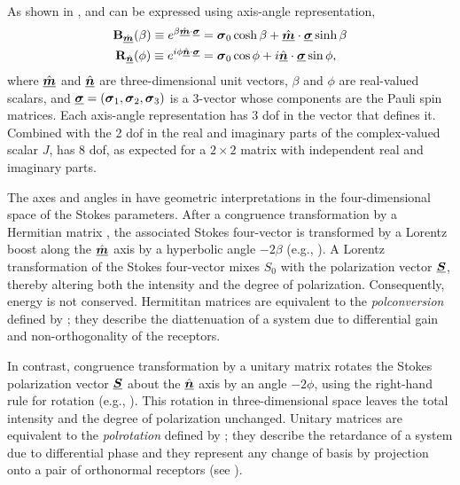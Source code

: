 As shown in ,  and
 can be expressed using axis-angle representation,
%
\begin{align}
\label{eqn:Boost}
{\bf B}_{\hat{\underline{\mbox{\scriptsize\boldmath $m$}}}}(\beta) \equiv e^{\beta \hat{\underline{\mbox{\scriptsize\boldmath $m$}}} \cdot \underline{\mbox{\scriptsize\boldmath $\sigma$}}} &= \mbox{\boldmath $\sigma$}_{0}\cosh\beta + \hat{\underline{\mbox{\boldmath $m$}}} \cdot \underline{\mbox{\boldmath $\sigma$}} \sinh\beta \\
\label{eqn:Rotation}
{\bf R}_{\hat{\underline{\mbox{\scriptsize\boldmath $n$}}}}(\phi) \equiv e^{ i \phi \hat{\underline{\mbox{\scriptsize\boldmath $n$}}} \cdot \underline{\mbox{\scriptsize\boldmath $\sigma$}} } &= \mbox{\boldmath $\sigma$}_{0}\cos\phi + i \hat{\underline{\mbox{\boldmath $n$}}} \cdot \underline{\mbox{\boldmath $\sigma$}} \sin\phi,
\end{align}
%
where $\hat{\underline{\mbox{\boldmath $m$}}}$ and $\hat{\underline{\mbox{\boldmath $n$}}}$ are three-dimensional unit vectors, $\beta$ and $\phi$ are real-valued scalars,
and
$\underline{\mbox{\boldmath $\sigma$}}=\left( \mbox{\boldmath $\sigma$}_{1}, \mbox{\boldmath $\sigma$}_{2}, \mbox{\boldmath $\sigma$}_{3} \right)$ is
a 3-vector whose components are the Pauli spin matrices.
%
Each axis-angle representation has 3 dof
%
%
in the vector 
that defines it.
%
Combined with the 2 dof in the real and imaginary parts of the complex-valued scalar $J$,  has 8 dof,
as expected for a $2\times2$ matrix with independent real and imaginary parts.

The axes and angles in  have geometric interpretations in the four-dimensional space of the Stokes parameters.
%
After a congruence transformation by a Hermitian matrix , the associated Stokes four-vector is transformed by a 
Lorentz boost along the $\hat{\underline{\mbox{\boldmath $m$}}}$ axis by a hyperbolic angle $-2\beta$ (e.g., ).
A Lorentz transformation of the Stokes four-vector mixes $S_0$ with the polarization vector $\underline{\mbox{\boldmath $S$}}$, thereby altering both the intensity and the degree of polarization.
%
Consequently, energy is not conserved.
%
Hermititan matrices are equivalent to the \emph{polconversion} defined by \cite{ham00}; they describe the diattenuation of a system \citep{lc96} due to differential gain and non-orthogonality of the receptors.

In contrast, congruence transformation by a unitary matrix
rotates the Stokes polarization vector $\underline{\mbox{\boldmath $S$}}$ about the $\hat{\underline{\mbox{\boldmath $n$}}}$ axis by
an angle $-2\phi$, using the right-hand rule for rotation (e.g., ).
%
This rotation in three-dimensional space leaves the total intensity and the degree of polarization unchanged. %
%
Unitary matrices are equivalent to the \emph{polrotation} defined by \cite{ham00}; they describe the retardance of a system \citep{lc96} due to differential phase and they represent any change of basis by projection onto a pair of orthonormal receptors (see ).

